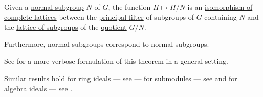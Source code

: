 \begin{theorem}\label{thm:lattice_theorem_for_subgroups}
  Given a \hyperref[def:normal_subgroup]{normal subgroup} \( N \) of \( G \), the function \( H \mapsto H / N \) is an \hyperref[def:lattice/morphism]{isomorphism of complete lattices} between the \hyperref[def:lattice_ideal/principal]{principal filter} of subgroups of \( G \) containing \( N \) and the \hyperref[thm:fol_lattice_of_substructures]{lattice of subgroups} of the \hyperref[def:group/quotient]{quotient} \( G / N \).

  Furthermore, normal subgroups correspond to normal subgroups.
\end{theorem}
\begin{comments}
  \item See  for a more verbose formulation of this theorem in a general setting.
  \item Similar results hold for \hyperref[def:ring/ideal]{ring ideals} --- see  --- for \hyperref[def:module/subobject]{submodules} --- see  and for \hyperref[def:algebra_over_ring/ideal]{algebra ideals} --- see .
\end{comments}
